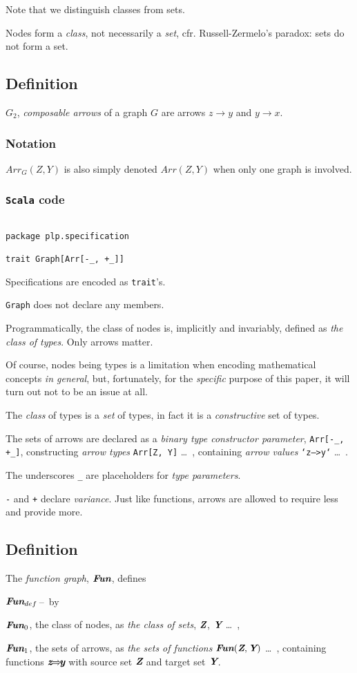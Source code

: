 \documentclass[11pt]{article}
\newcommand{\Fun}{\mbox{\bf {\em Fun}}}
\newcommand{\Z}{\mbox{\bf {\em Z}}}
\newcommand{\Y}{\mbox{\bf {\em Y}}}
\newcommand{\arrow}[2]{#1\!\!\rightarrow\!\!#2}
\newcommand{\function}[2]{\mbox{\bf{\em #1}} \!\!\Rightarrow\!\!\! \mbox{\bf{\em #2}}}
\newcommand{\defn}{\subsection{Definition}\begingroup\rm}
\renewcommand{\not}{\subsubsection{Notation}\begingroup\rm}
\newcommand{\code}{\subsubsection{{\tt Scala} code}\begingroup\rm \vspace{12pt}}
\def\edefn{\endgroup\par\pagebreak[2]\addvspace{\medskipamount}}
\let\enot=\edefn
\let\ecode=\edefn
\newcounter{lister}
\newenvironment{labeledlist}[1]
{\begin{list}{{\rm#1\,--\,\arabic{lister}}}{\usecounter{lister}
\settowidth{\labelwidth}{#1--1}
\leftmargin\labelwidth \advance\leftmargin by \labelsep
}}
{\end{list}}
\def\blist#1{\begin{labeledlist}{#1}\setcounter{lister}{-1}}
\newcommand{\elist}{\end{labeledlist}}
\begin{document}
Note that we distinguish classes from sets.

Nodes form a {\em class}, not necessarily a {\em set}, cfr. Russell-Zermelo's paradox: sets do not form a set.

\defn\label{composabale arrows}
$G_2$, {\em composable arrows} of a graph $G$ are arrows $\arrow{z}{y}$ and $\arrow{y}{x}$.
\edefn

\not
$Arr_{G}(Z,Y)$ is also simply denoted $Arr(Z,Y)$ when only one graph is involved.
\enot

\code
\begin{mdframed}[backgroundcolor=lightgray!20] 
\begin{lstlisting}

package plp.specification

trait Graph[Arr[-_, +_]]
\end{lstlisting}
\end{mdframed}

Specifications are encoded as {\tt trait}'s. 

{\tt Graph} does not declare any members.

Programmatically, the class of nodes is, implicitly and invariably, defined as 
{\em the class of types}. Only arrows matter. 

Of course, nodes being types is a limitation when encoding mathematical concepts {\em in general}, but, fortunately,
for the {\em specific} purpose of this paper, it will turn out not to be an issue at all.

The {\em class} of types is a {\em set} of types, in fact it is a {\em constructive} set of types.

The sets of arrows are declared as a {\em binary type constructor parameter},
{\tt Arr[-\_, +\_]}, constructing {\em arrow types} \newline
{\tt Arr[Z, Y]} \ldots\, , containing {\em arrow values} {\tt `z-->y`}
\ldots\, .

The underscores {\tt\_} are placeholders for {\em type parameters}.

{\tt -} and {\tt +} declare {\em variance}. Just like functions, arrows are allowed to require less and
provide more.
\ecode

\defn\label{function graph}
The {\em function graph}, $\Fun$, defines
\blist{$\Fun_{def}$}
\item $\Fun_0$, the class of nodes, as {\em the class of sets}, $\Z$, $\Y$ \ldots\, ,
\item $\Fun_1$, the sets of arrows, as {\em the sets of functions} $\Fun(\Z,\Y)$ \ldots\, ,
containing functions $\function{z}{y}$ with source set $\Z$ and target set $\Y$.
\elist
\edefn
\end{document}
